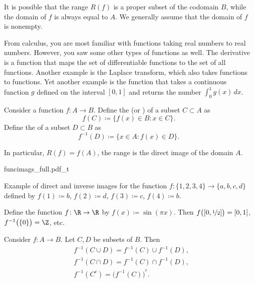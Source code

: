 It is possible that the range $R(f)$ is a proper subset of the codomain $B$,
while the domain of $f$ is always equal to $A$.  We generally 
assume that the domain of $f$ is nonempty.

\begin{example}
From calculus, you are most familiar with functions taking real numbers to real
numbers.  However, you saw some other types of functions as well.
The derivative is a function that maps the set of
differentiable functions to the set of all functions.
Another example is the Laplace transform, which also
takes functions to functions.  Yet another example is the function that takes
a continuous function $g$ defined on the interval $[0,1]$ and returns the
number $\int_0^1 g(x) \,dx$.
\end{example}

\begin{defn}
Consider a function $f \colon A \to B$.  Define
the \emph{} (or \emph{}) of a subset
$C \subset A$ as
\begin{equation*}
f(C) \coloneqq \bigl\{ f(x) \in B : x \in C \bigr\} .
\end{equation*}
Define the \emph{} of a subset $D
\subset B$ as
\begin{equation*}
f^{-1}(D) \coloneqq \bigl\{ x \in A : f(x) \in D \bigr\} .
\end{equation*}
\end{defn}

In particular, $R(f) = f(A)$, the range is the direct image of
the domain $A$.

\begin{myfigureht}
{funcimags_full.pdf_t}
\caption{Example of direct and inverse images for the function
$f \colon \{ 1,2,3,4 \} \to \{ a,b,c,d \}$ defined by
$f(1) \coloneqq b$,
$f(2) \coloneqq d$,
$f(3) \coloneqq c$,
$f(4) \coloneqq b$.\label{figfuncimags}}
\end{myfigureht}

\begin{example}
Define the function $f \colon \R \to \R$ by
$f(x) \coloneqq \sin(\pi x)$.  Then $f\bigl([0,\nicefrac{1}{2}]\bigr) = [0,1]$, 
$f^{-1}\bigl(\{0\}\bigr) = \Z$, etc.
\end{example}

\begin{prop} \label{st:propinv}
Consider $f \colon A \to B$.  Let $C, D$ be subsets of $B$.  Then
\begin{align*}
& f^{-1}( C \cup D) = f^{-1} (C) \cup f^{-1} (D) , \\
& f^{-1}( C \cap D) = f^{-1} (C) \cap f^{-1} (D) , \\
& f^{-1}( C^c) = {\bigl( f^{-1} (C) \bigr)}^c .
\end{align*}
\end{prop}

